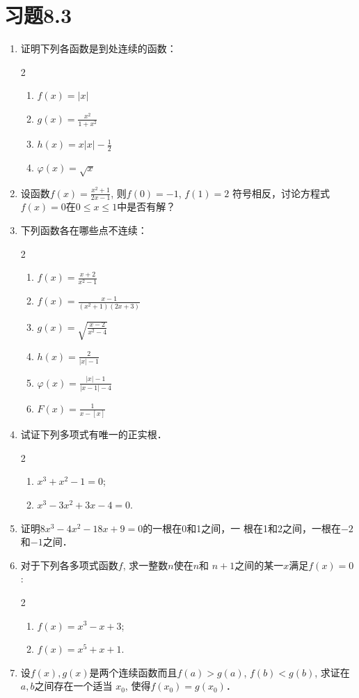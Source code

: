 \section*{习题8.3}
\begin{enumerate}
    \item 证明下列各函数是到处连续的函数：
\begin{multicols}{2}
\begin{enumerate}
    \item $f(x)=|x|$
    \item $g(x)=\frac{x^2}{1+x^2}$
    \item $h(x)=x|x|-\frac{1}{2}$
    \item $\varphi(x)=\sqrt{x}$
\end{enumerate}
\end{multicols}

\item 设函数$f(x)=\frac{x^2+1}{2x-1}$, 
则$f(0)=-1$, $f(1)=2$
符号相反，讨论方程式$f(x)=0$在$0\le x\le 1$中是否有解？
\item 下列函数各在哪些点不连续：
\begin{multicols}{2}
\begin{enumerate}
    \item $f(x)=\frac{x+2}{x^2-1}$
    \item $f(x)=\frac{x-1}{(x^2+1)(2x+3)}$
    \item $g(x)=\sqrt{\frac{x-2}{x^2-4}}$
    \item $h(x)=\frac{2}{|x|-1}$
    \item $\varphi(x)=\frac{|x|-1}{|x-1|-4}$
    \item $F(x)=\frac{1}{x-[x]}$
\end{enumerate}
\end{multicols}

\item 试证下列多项式有唯一的正实根．
\begin{multicols}{2}
    \begin{enumerate}
        \item $x^3+x^2-1=0$;
        \item $x^3-3x^2+3x-4=0$.
\end{enumerate}
\end{multicols}
\item 证明$8x^3-4x^2-18x+9=0$的一根在0和1之间，一
根在1和2之间，一根在$-2$和$-1$之间．
\item 对于下列各多项式函数$f$, 求一整数$n$使在$n$和
$n+1$之间的某一$x$满足$f(x)=0$:
\begin{multicols}{2}
    \begin{enumerate}
        \item $f(x)=x^3-x+3$;
        \item  $f(x)=x^5+x+1$.
\end{enumerate}
\end{multicols}
\item 设$f(x),g(x)$是两个连续函数而且$f(a)>
g(a)$, $f(b)<g(b)$, 求证在$a,b$之间存在一个适当
$x_0$, 使得$f(x_0)=g(x_0)$．


\end{enumerate}
